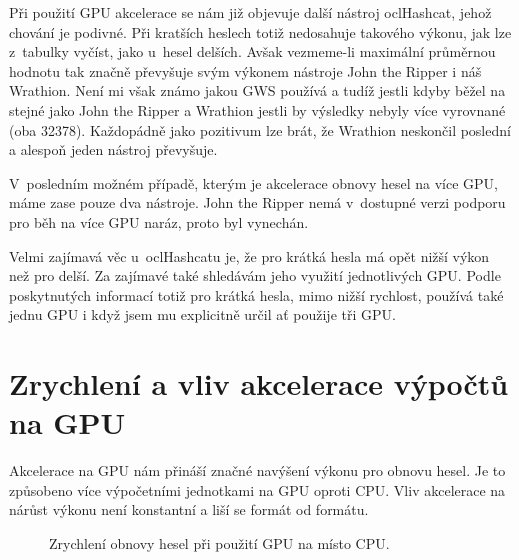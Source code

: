 Při použití GPU akcelerace se nám již objevuje další nástroj oclHashcat, jehož chování je
podivné. Při kratších heslech totiž nedosahuje takového výkonu, jak lze z~tabulky vyčíst, jako
u~hesel delších. Avšak vezmeme-li maximální průměrnou hodnotu tak značně převyšuje svým výkonem
nástroje John the Ripper i náš Wrathion. Není mi však známo jakou GWS používá a tudíž jestli
kdyby běžel na stejné jako John the Ripper a Wrathion jestli by výsledky nebyly více vyrovnané
(oba 32378). Každopádně jako pozitivum lze brát, že Wrathion neskončil poslední a alespoň jeden
nástroj převyšuje.

V~posledním možném případě, kterým je akcelerace obnovy hesel na více GPU, máme zase pouze dva
nástroje. John the Ripper nemá v~dostupné verzi podporu pro běh na více GPU naráz, proto byl
vynechán. 

Velmi zajímavá věc u~oclHashcatu je, že pro krátká hesla má opět nižší výkon než pro delší. Za
zajímavé také shledávám jeho využití jednotlivých GPU. Podle poskytnutých informací totiž pro
krátká hesla, mimo nižší rychlost, používá také jednu GPU i když jsem mu explicitně určil ať
použije tři GPU.
\section{Zrychlení a vliv akcelerace výpočtů na GPU}
\label{sec:zrychlenit}
Akcelerace na GPU nám přináší značné navýšení výkonu pro obnovu hesel. Je to způsobeno více
výpočetními jednotkami na GPU oproti CPU. Vliv akcelerace na nárůst výkonu není konstantní a liší
se formát od formátu.
\begin{figure}[ht]
    \begin{center}
	\caption{Zrychlení obnovy hesel při použití GPU na místo CPU.}
	\label{memory}
    \end{center}
\end{figure}

